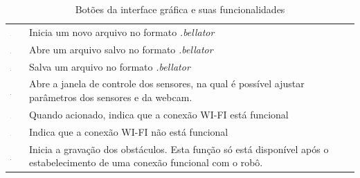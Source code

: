 \begin{table}[H]
  \caption{Botões da interface gráfica e suas funcionalidades}
  \centering
  \begin{tabular}{p{2cm}p{12cm}}
    \toprule
    \includegraphics[width=0.03\textwidth]{./images/document-new.png} & Inicia um novo arquivo no formato \textit{.bellator} \\
    \includegraphics[width=0.03\textwidth]{./images/document-open.png} & Abre um arquivo salvo no formato \textit{.bellator} \\
    \includegraphics[width=0.03\textwidth]{./images/document-save_24.png} & Salva um arquivo no formato \textit{.bellator} \\
    \includegraphics[width=0.03\textwidth]{./images/camera-web.png} & Abre a janela de controle dos sensores, na qual é possível ajustar parâmetros dos sensores e da webcam. \\
    \includegraphics[width=0.03\textwidth]{./images/wifi2-blue.png} & Quando acionado, indica que a conexão WI-FI está funcional \\
    \includegraphics[width=0.03\textwidth]{./images/wifi2-red.png} &  Indica que a conexão WI-FI não está funcional \\
    \includegraphics[width=0.03\textwidth]{./images/gtk-media-record.png} & Inicia a gravação dos obstáculos. Esta função só está disponível após o estabelecimento de uma conexão funcional com o robô.\\
    \hline
  \end{tabular}
  \label{tab:alternativas_desenho}
\end{table}

